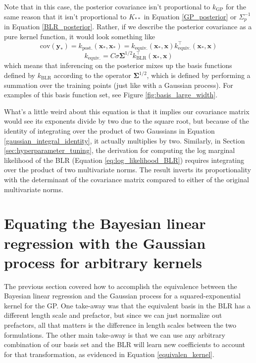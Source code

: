 \documentclass{article}
\begin{document}
Note that in this case, the posterior covariance isn't proportional to $k_\text{GP}$ for the same reason that it isn't proportional to $K_{\ast\ast}$ in Equation \ref{GP_posterior} or $\Sigma_p^{-1}$ in Equation \ref{BLR_posterior}. Rather, if we describe the posterior covariance as a pure kernel function, it would look something like 
\begin{equation}
    \text{cov}(\mathbf{y_\ast})= k_\text{post.}(\mathbf{x}_\ast,\mathbf{x}_\ast) =
    k_\text{equiv.}(\mathbf{x}_\ast,\mathbf{x}) k_\text{equiv.}^\top(\mathbf{x}_\ast,\mathbf{x})
\end{equation}\begin{equation}
\label{equivalen_kernel}
    k_\text{equiv.} = C\sigma\boldsymbol{\Sigma}^{1/2}k_\text{BLR}^\top(\mathbf{x}_\ast,\mathbf{x})
\end{equation}which means that inferencing on the posterior mixes up the basis functions defined by $k_\text{BLR}$ according to the operator $\boldsymbol{\Sigma}^{1/2}$, which is defined by performing a summation over the training points (just like with a Gaussian process).  For examples of this basis function set, see Figure \ref{fig:basis_large_width}.

What's a little weird about this equation is that it implies our covariance matrix would see its exponents divide by two due to the square root, but because of the identity of integrating over the product of two Gaussians in Equation \ref{gaussian_integral_identity}, it actually multiplies by two. Similarly, in Section \ref{sec:hyperparameter_tuning}, the derivation for computing the log marginal likelihood of the BLR (Equation \ref{eq:log_likelihood_BLR}) requires integrating over the product of two multivariate norms. The result inverts its proportionality with the determinant of the covariance matrix compared to either of the original multivariate norms.

\section{Equating the Bayesian linear regression with the Gaussian process for arbitrary kernels}

The previous section covered how to accomplish the equivalence between the Bayesian linear regression and the Gaussian process for a squared-exponential kernel for the GP. One take-away was that the equivalent basis in the BLR has a different length scale and prefactor, but since we can just normalize out prefactors, all that matters is the difference in length scales between the two formulations. The other main take-away is that we can use any arbitrary combination of our basis set and the BLR will learn new coefficients to account for that transformation, as evidenced in Equation \ref{equivalen_kernel}.
\end{document}
